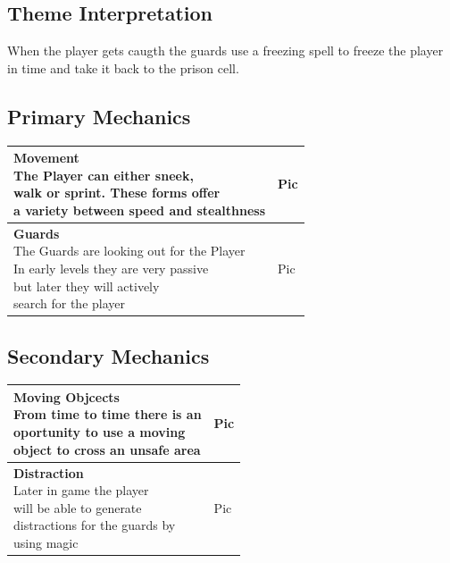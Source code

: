 \documentclass[12pt, a4paper]{article}
\begin{document}
{        \subsection{Theme Interpretation} %
            When the player gets caugth the guards use a freezing spell
            to freeze the player in time and take it back to the prison cell.

        \subsection{Primary Mechanics}
            \begin{table}[h]
                \centering
                \begin{tabular}{| m{7cm} | m{7cm} |}\hline
                    \thead{\textbf{Movement}\\The Player can either sneek, \\walk or sprint. These forms offer \\a variety between speed and stealthness} & Pic\\\hline
                    \thead{\textbf{Guards}\\The Guards are looking out for the Player\\In early levels they are very passive\\but later they will actively \\search for the player} & Pic\\\hline
                \end{tabular}
            \end{table}
        \newpage
        \subsection{Secondary Mechanics}
            \begin{table}[h]
                \centering
                \begin{tabular}{| m{7cm} | m{7cm} |}\hline
                    \thead{\textbf{Moving Objcects}\\From time to time there is an\\oportunity to use a moving\\object to cross an unsafe area} & Pic\\\hline
                    \thead{\textbf{Distraction}\\Later in game the player\\will be able to generate\\distractions for the guards by\\using magic} & Pic\\\hline
                \end{tabular}
            \end{table}
}
\end{document}
